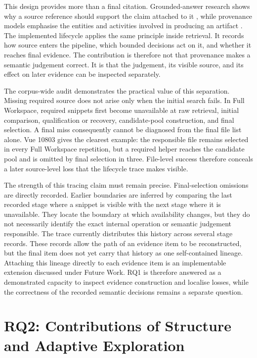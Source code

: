 This design provides more than a final citation. Grounded-answer research shows why a source reference should support the claim attached to it \textcite{Gao2023ALCE}, while provenance models emphasise the entities and activities involved in producing an artifact \textcite{W3C2013PROV}. The implemented lifecycle applies the same principle inside retrieval. It records how source enters the pipeline, which bounded decisions act on it, and whether it reaches final evidence. The contribution is therefore not that provenance makes a semantic judgement correct. It is that the judgement, its visible source, and its effect on later evidence can be inspected separately.

The corpus-wide audit demonstrates the practical value of this separation. Missing required source does not arise only when the initial search fails. In Full Workspace, required snippets first become unavailable at raw retrieval, initial comparison, qualification or recovery, candidate-pool construction, and final selection. A final miss consequently cannot be diagnosed from the final file list alone. Vue 10803 gives the clearest example: the responsible file remains selected in every Full Workspace repetition, but a required helper reaches the candidate pool and is omitted by final selection in three. File-level success therefore conceals a later source-level loss that the lifecycle trace makes visible.

The strength of this tracing claim must remain precise. Final-selection omissions are directly recorded. Earlier boundaries are inferred by comparing the last recorded stage where a snippet is visible with the next stage where it is unavailable. They locate the boundary at which availability changes, but they do not necessarily identify the exact internal operation or semantic judgement responsible. The trace currently distributes this history across several stage records. These records allow the path of an evidence item to be reconstructed, but the final item does not yet carry that history as one self-contained lineage. Attaching this lineage directly to each evidence item is an implementable extension discussed under Future Work. RQ1 is therefore answered as a demonstrated capacity to inspect evidence construction and localise losses, while the correctness of the recorded semantic decisions remains a separate question.

\section{RQ2: Contributions of Structure and Adaptive Exploration}\label{sec:rq2-contributions-of-structure-and-adaptive-exploration}

